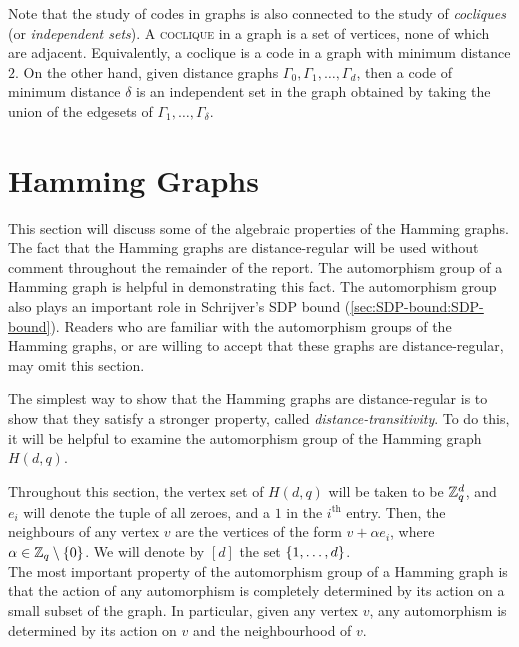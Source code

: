 \documentclass{report}
\begin{document}
    Note that the study of codes in graphs is also connected to the study of
    \textit{cocliques} (or \textit{independent sets}).  A \textsc{coclique} in a
    graph is a set of vertices, none of which are adjacent.  Equivalently, a
    coclique is a code in a graph with minimum distance $2$.  On the other hand,
    given distance graphs $\Gamma_0, \Gamma_1, \ldots, \Gamma_d$, then a code of
    minimum distance $\delta$ is an independent set in the graph obtained by
    taking the union of the edgesets of $\Gamma_1, \ldots, \Gamma_\delta$.

  \section{Hamming Graphs}\label{sec:intro:hamming}

    This section will discuss some of the algebraic properties of the Hamming
    graphs.  The fact that the Hamming graphs are distance-regular will be used
    without comment throughout the remainder of the report.  The automorphism
    group of a Hamming graph is helpful in demonstrating this fact.  The
    automorphism group also plays an important role in Schrijver's SDP bound
    (\ref{sec:SDP-bound:SDP-bound}).  Readers who are familiar with the
    automorphism groups of the Hamming graphs, or are willing to accept that
    these graphs are distance-regular, may omit this section.  

    The simplest way to show that the Hamming graphs are distance-regular is to
    show that they satisfy a stronger property, called
    \textit{distance-transitivity}.  To do this, it will be helpful to examine
    the automorphism group of the Hamming graph $H(d, q)$.

    Throughout this section, the vertex set of $H(d, q)$ will be taken to be
    $\mathbb{Z}_q^d$, and $e_i$ will denote the tuple of all zeroes, and a $1$ in the
    $i^\text{th}$ entry.  Then, the neighbours of any vertex $v$ are the
    vertices of the form $v + \alpha e_i$, where $\alpha \in \mathbb{Z}_q \setminus
    \left\lbrace 0 \right\rbrace$.  We will denote by $[d]$ the set $\left\lbrace 1, \ldots, d \right\rbrace$.
    \\

    The most important property of the automorphism group of a Hamming graph is
    that the action of any automorphism is completely determined by its action
    on a small subset of the graph.  In particular, given any vertex $v$, any
    automorphism is determined by its action on $v$ and the neighbourhood of
    $v$.  
\end{document}
